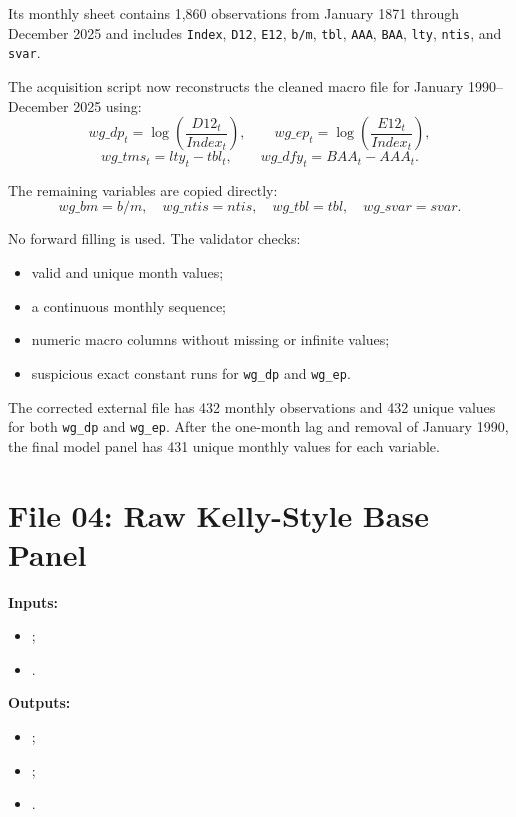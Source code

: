 \documentclass[11pt,a4paper]{article}
\newcommand{\code}[1]{\texttt{#1}}
\begin{document}
Its monthly sheet contains 1,860 observations from January 1871 through December 2025 and includes \code{Index}, \code{D12}, \code{E12}, \code{b/m}, \code{tbl}, \code{AAA}, \code{BAA}, \code{lty}, \code{ntis}, and \code{svar}.

The acquisition script  now reconstructs the cleaned macro file for January 1990--December 2025 using:
\[
  wg\_dp_t=\log\left(\frac{D12_t}{Index_t}\right),
  \qquad
  wg\_ep_t=\log\left(\frac{E12_t}{Index_t}\right),
\]
\[
  wg\_tms_t=lty_t-tbl_t,
  \qquad
  wg\_dfy_t=BAA_t-AAA_t.
\]

The remaining variables are copied directly:
\[
  wg\_bm=b/m,\quad wg\_ntis=ntis,\quad
  wg\_tbl=tbl,\quad wg\_svar=svar.
\]

No forward filling is used. The validator checks:
\begin{itemize}
  \item valid and unique month values;
  \item a continuous monthly sequence;
  \item numeric macro columns without missing or infinite values;
  \item suspicious exact constant runs for \code{wg\_dp} and \code{wg\_ep}.
\end{itemize}

The corrected external file has 432 monthly observations and 432 unique values for both \code{wg\_dp} and \code{wg\_ep}. After the one-month lag and removal of January 1990, the final model panel has 431 unique monthly values for each variable.

\section{File 04: Raw Kelly-Style Base Panel}

\textbf{Inputs:}
\begin{itemize}
  \item {};
  \item {}.
\end{itemize}

\textbf{Outputs:}
\begin{itemize}
  \item {};
  \item {};
  \item {}.
\end{itemize}
\end{document}
